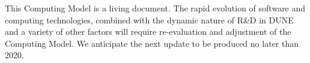 This Computing Model is a living document.
The rapid evolution of software and computing technologies, combined with the dynamic nature of R\&D in DUNE
and a variety of other factors will require re-evaluation and adjustment of the Computing Model. 
We anticipate the next update to be produced no later than 2020.
